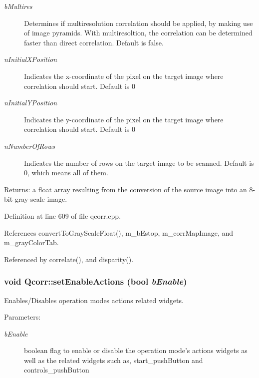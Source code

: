 \begin{Desc}
\begin{description}
\item[{\em bMultires}]Determines if multiresolution correlation should be applied, by making use of image pyramids. With multiresoltion, the correlation can be determined faster than direct correlation. Default is false. \item[{\em nInitialXPosition}]Indicates the x-coordinate of the pixel on the target image where correlation should start. Default is 0 \item[{\em nInitialYPosition}]Indicates the y-coordinate of the pixel on the target image where correlation should start. Default is 0 \item[{\em nNumberOfRows}]Indicates the number of rows on the target image to be scanned. Default is 0, which means all of them. \end{description}
\end{Desc}
\begin{Desc}
\item[Returns:]a float array resulting from the conversion of the source image into an 8-bit gray-scale image. \end{Desc}


Definition at line 609 of file qcorr.cpp.

References convertToGrayScaleFloat(), m\_\-bEstop, m\_\-corrMapImage, and m\_\-grayColorTab.

Referenced by correlate(), and disparity().\hypertarget{classQcorr_2de6d6969bdf48b225acc5ebbae063f7}{
\subsubsection[{setEnableActions}]{\setlength{\rightskip}{0pt plus 5cm}void Qcorr::setEnableActions (bool {\em bEnable})}}
\label{classQcorr_2de6d6969bdf48b225acc5ebbae063f7}


Enables/Disables operation modes actions related widgets. 

\begin{Desc}
\item[Parameters:]
\begin{description}
\item[{\em bEnable}]boolean flag to enable or disable the operation mode's actions widgets as well as the related widgets such as, start\_\-pushButton and controls\_\-pushButton \end{description}
\end{Desc}


